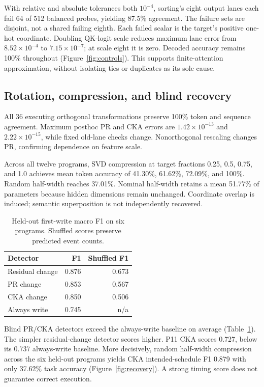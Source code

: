 \documentclass[10pt,a4paper,twocolumn]{article}
\begin{document}
With relative and absolute tolerances both $10^{-4}$, sorting's eight output lanes each fail 64 of 512 balanced probes, yielding 87.5\% agreement. The failure sets are disjoint, not a shared failing eighth. Each failed scalar is the target's positive one-hot coordinate. Doubling QK-logit scale reduces maximum lane error from $8.52\times10^{-4}$ to $7.15\times10^{-7}$; at scale eight it is zero. Decoded accuracy remains 100\% throughout (Figure~\ref{fig:controls}). This supports finite-attention approximation, without isolating ties or duplicates as its sole cause.

\subsection{Rotation, compression, and blind recovery}
All 36 executing orthogonal transformations preserve 100\% token and sequence agreement. Maximum posthoc PR and CKA errors are $1.42\times10^{-13}$ and $2.22\times10^{-15}$, while fixed old-lane checks change. Nonorthogonal rescaling changes PR, confirming dependence on feature scale.

Across all twelve programs, SVD compression at target fractions 0.25, 0.5, 0.75, and 1.0 achieves mean token accuracy of 41.30\%, 61.62\%, 72.09\%, and 100\%. Random half-width reaches 37.01\%. Nominal half-width retains a mean 51.77\% of parameters because hidden dimensions remain unchanged. Coordinate overlap is induced; semantic superposition is not independently recovered.

\begin{table}[t]
\centering\small
\caption{Held-out first-write macro F1 on six programs. Shuffled scores preserve predicted event counts.}
\label{tab:recovery}
\begin{tabular}{@{}lrr@{}}
\toprule
Detector & F1 & Shuffled F1\\
\midrule
Residual change & 0.876 & 0.673\\
PR change & 0.853 & 0.567\\
CKA change & 0.850 & 0.506\\
Always write & 0.745 & n/a\\
\bottomrule
\end{tabular}
\end{table}

Blind PR/CKA detectors exceed the always-write baseline on average (Table~\ref{tab:recovery}). The simpler residual-change detector scores higher. P11 CKA scores 0.727, below its 0.737 always-write baseline. More decisively, random half-width compression across the six held-out programs yields CKA intended-schedule F1 0.879 with only 37.62\% task accuracy (Figure~\ref{fig:recovery}). A strong timing score does not guarantee correct execution.
\end{document}
